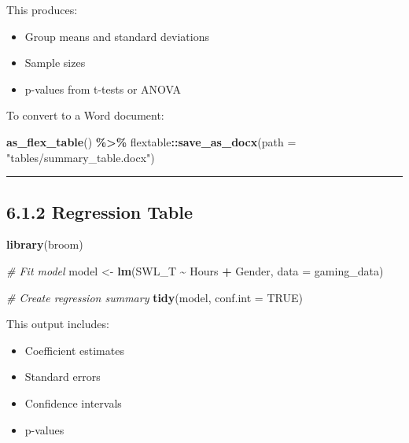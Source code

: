 \documentclass[
]{book}
\newenvironment{Shaded}{\begin{snugshade}}{\end{snugshade}}
\newcommand{\AttributeTok}[1]{\textcolor[rgb]{0.13,0.29,0.53}{#1}}
\newcommand{\CommentTok}[1]{\textcolor[rgb]{0.56,0.35,0.01}{\textit{#1}}}
\newcommand{\ConstantTok}[1]{\textcolor[rgb]{0.56,0.35,0.01}{#1}}
\newcommand{\FunctionTok}[1]{\textcolor[rgb]{0.13,0.29,0.53}{\textbf{#1}}}
\newcommand{\NormalTok}[1]{#1}
\newcommand{\OtherTok}[1]{\textcolor[rgb]{0.56,0.35,0.01}{#1}}
\newcommand{\SpecialCharTok}[1]{\textcolor[rgb]{0.81,0.36,0.00}{\textbf{#1}}}
\newcommand{\StringTok}[1]{\textcolor[rgb]{0.31,0.60,0.02}{#1}}
\providecommand{\tightlist}{%
  \setlength{\itemsep}{0pt}\setlength{\parskip}{0pt}}
\begin{document}
This produces:

\begin{itemize}
\tightlist
\item
  Group means and standard deviations
\item
  Sample sizes
\item
  p-values from t-tests or ANOVA
\end{itemize}

To convert to a Word document:

\begin{Shaded}
\begin{Highlighting}[]
\FunctionTok{as\_flex\_table}\NormalTok{() }\SpecialCharTok{\%\textgreater{}\%}
\NormalTok{  flextable}\SpecialCharTok{::}\FunctionTok{save\_as\_docx}\NormalTok{(}\AttributeTok{path =} \StringTok{"tables/summary\_table.docx"}\NormalTok{)}
\end{Highlighting}
\end{Shaded}

\begin{center}\rule{0.5\linewidth}{0.5pt}\end{center}

\subsection{6.1.2 Regression Table}\label{regression-table}

\begin{Shaded}
\begin{Highlighting}[]
\FunctionTok{library}\NormalTok{(broom)}

\CommentTok{\# Fit model}
\NormalTok{model }\OtherTok{\textless{}{-}} \FunctionTok{lm}\NormalTok{(SWL\_T }\SpecialCharTok{\textasciitilde{}}\NormalTok{ Hours }\SpecialCharTok{+}\NormalTok{ Gender, }\AttributeTok{data =}\NormalTok{ gaming\_data)}

\CommentTok{\# Create regression summary}
\FunctionTok{tidy}\NormalTok{(model, }\AttributeTok{conf.int =} \ConstantTok{TRUE}\NormalTok{)}
\end{Highlighting}
\end{Shaded}

This output includes:

\begin{itemize}
\tightlist
\item
  Coefficient estimates
\item
  Standard errors
\item
  Confidence intervals
\item
  p-values
\end{itemize}
\end{document}

